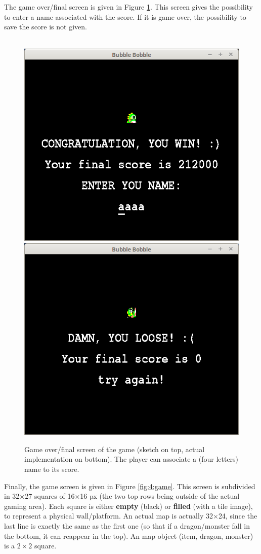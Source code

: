 \documentclass[12pt,a4paper]{article}
\begin{document}
The game over/final screen is given in Figure \ref{fig:3:gameover}. This screen gives the possibility to enter a name associated with the score. If it is game over, the possibility to save the score is not given.

\begin{figure}[!h]
	\centering
	 \\
	\vspace{.5cm}
			\includegraphics[width=.45\linewidth]{i/screen4}\hspace{.5cm}
			\includegraphics[width=.45\linewidth]{i/screen4b}
	\caption{Game over/final screen of the game (sketch on top, actual implementation on bottom). The player can associate a (four letters) name to its score.}
	\label{fig:3:gameover}
\end{figure}

Finally, the game screen is given in Figure \ref{fig:4:game}. This screen is subdivided in 32$\times$27 squares of 16$\times$16 px (the two top rows being outside of the actual gaming area). Each square is either \textbf{empty} (black) or \textbf{filled} (with a tile image), to represent a physical wall/platform. An actual map is actually 32$\times$24, since the last line is exactly the same as the first one (so that if a dragon/monster fall in the bottom, it can reappear in the top). An map object (item, dragon, monster) is a $2\times2$ square.
\end{document}
